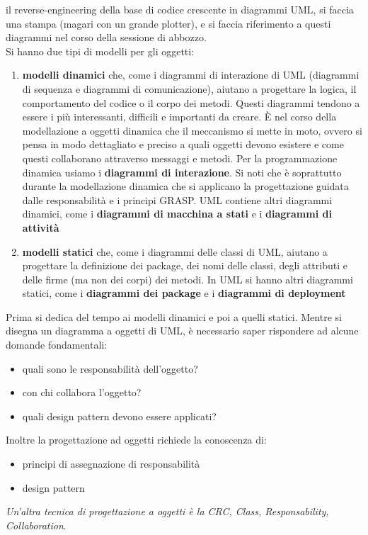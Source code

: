 \documentclass[a4paper,12pt, oneside]{book}
\begin{document}
il reverse-engineering della base di codice crescente in diagrammi UML, si faccia una
stampa (magari con un grande plotter), e si faccia riferimento a questi diagrammi nel
corso della sessione di abbozzo.\\
Si hanno due tipi di modelli per gli oggetti:
\begin{enumerate}
	\item \textbf{modelli dinamici} che, come i diagrammi di interazione di UML (diagrammi di sequenza e diagrammi di comunicazione), aiutano a progettare la logica, il comportamento del codice o il corpo dei metodi. Questi diagrammi tendono a essere i più interessanti, difficili e importanti da creare. È nel corso della modellazione a oggetti dinamica  che il meccanismo si mette in moto, ovvero si pensa in modo dettagliato e preciso a quali oggetti devono esistere e come questi collaborano attraverso messaggi e metodi. Per la programmazione dinamica usiamo i \textbf{diagrammi di interazione}. Si noti che è soprattutto durante la modellazione dinamica che si applicano la progettazione guidata dalle responsabilità e i principi GRASP. UML contiene altri diagrammi dinamici, come i \textbf{diagrammi di macchina a stati} e i \textbf{diagrammi di attività}
	\item \textbf{modelli statici} che, come i diagrammi delle classi di UML, aiutano a progettare la definizione dei package, dei nomi delle classi, degli attributi e delle firme (ma non dei corpi) dei metodi. In UML si hanno altri diagrammi statici, come i \textbf{diagrammi dei package} e i \textbf{diagrammi di deployment}
\end{enumerate}
Prima si dedica del tempo ai modelli dinamici e poi a quelli statici.
\newpage
Mentre si disegna un diagramma a oggetti di UML, è necessario saper rispondere ad alcune domande fondamentali:
\begin{itemize}
	\item quali sono le responsabilità dell'oggetto? 
	\item con chi collabora l'oggetto? 
	\item quali design pattern devono essere applicati?
\end{itemize}
Inoltre la progettazione ad oggetti richiede la conoscenza di:
\begin{itemize}
	\item principi di assegnazione di responsabilità
	\item design pattern
\end{itemize}
\textit{Un'altra tecnica di progettazione a oggetti è la CRC, Class, Responsability, Collaboration}.\\
\end{document}
